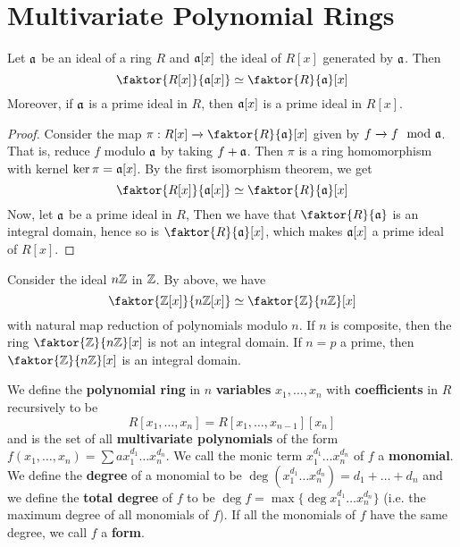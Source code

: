 \section{Multivariate Polynomial Rings}
\label{section_7.1}

\begin{theorem}\label{theorem_7.1.1}
  Let $\mathfrak{a}$ be an ideal of a ring $R$ and $\mathfrak{a}[x]$ the ideal of $R[x]$ generated by
  $\mathfrak{a}$. Then
  \begin{equation*}
    \faktor{R[x]}{\af[x]} \simeq \faktor{R}{\af}[x]
  \end{equation*}
  Moreover, if $\mathfrak{a}$ is a prime ideal in $R$, then $\mathfrak{a}[x]$ is a prime ideal in
  $R[x]$.
\end{theorem}
\begin{proof}
  Consider the map $\pi:R[x] \xrightarrow{} \faktor{R}{\af}[x]$ given by $f
  \xrightarrow{} f \mod{\mathfrak{a}}$. That is, reduce $f$ modulo $\mathfrak{a}$ by
  taking $f+\mathfrak{a}$. Then $\pi$ is a ring homomorphism with kernel
  $\ker{\pi}=\mathfrak{a}[x]$. By the first isomorphism theorem, we get
  \begin{equation*}
    \faktor{R[x]}{\af[x]} \simeq \faktor{R}{\af}[x]
  \end{equation*}
  Now, let $\mathfrak{a}$ be a prime ideal in $R$, Then we have that
  $\faktor{R}{\af}$ is an integral domain, hence so is $\faktor{R}{\af}[x]$,
  which makes $\mathfrak{a}[x]$ a prime ideal of $R[x]$.
\end{proof}

\begin{example}\label{example_7.1}
  Consider the ideal $n\mathbb{Z}$ in  $\mathbb{Z}$. By above, we have
  \begin{equation*}
    \faktor{\Z[x]}{n\Z[x]} \simeq \faktor{\Z}{n\Z}[x]
  \end{equation*}
  with natural map reduction of polynomials modulo $n$. If $n$ is composite,
  then the ring $\faktor{\Z}{n\Z}[x]$ is not an integral domain. If $n=p$ a
  prime, then  $\faktor{\Z}{n\Z}[x]$ is an integral domain.
\end{example}

\begin{definition}
  We define the \textbf{polynomial ring} in $n$  \textbf{variables} $x_1,
  \dots, x_n$ with \textbf{coefficients} in $R$ recursively to be
  \begin{equation*}
    R[x_1, \dots, x_n]=R[x_1, \dots, x_{n-1}][x_n]
  \end{equation*}
  and is the set of all \textbf{multivariate polynomials} of the form $f(x_1,
  \dots,x_n)=\sum{ax_1^{d_1} \dots x_n^{d_n}}$. We call the monic term
  $x_1^{d_1} \dots x_n^{d_n}$ of $f$ a  \textbf{monomial}. We define the
  \textbf{degree} of a monomial to be $\deg{(x_1^{d_1} \dots
  x_n^{d_n})}=d_1+\dots+d_n$ and we define the \textbf{total degree}
  of $f$ to be $\deg{f}=\max{\{\deg{x_1^{d_1} \dots x_n^{d_n}}\}}$
  (i.e. the maximum degree of all monomials of $f$). If all the
  monomials of $f$ have the same degree, we call  $f$ a \textbf{form}.
\end{definition}

